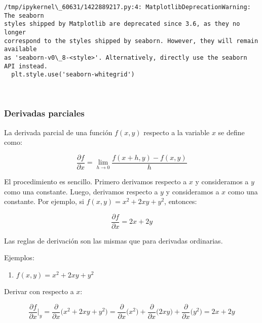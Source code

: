 \documentclass[11pt]{article}
\providecommand{\tightlist}{%
      \setlength{\itemsep}{0pt}\setlength{\parskip}{0pt}}
\begin{document}
    \begin{Verbatim}[commandchars=\\\{\}]
/tmp/ipykernel\_60631/1422889217.py:4: MatplotlibDeprecationWarning: The seaborn
styles shipped by Matplotlib are deprecated since 3.6, as they no longer
correspond to the styles shipped by seaborn. However, they will remain available
as 'seaborn-v0\_8-<style>'. Alternatively, directly use the seaborn API instead.
  plt.style.use('seaborn-whitegrid')
    \end{Verbatim}

    \begin{center}
    \end{center}
    { \hspace*{\fill} \\}
    
    \hypertarget{derivadas-parciales}{%
\subsubsection{Derivadas parciales}\label{derivadas-parciales}}

La derivada parcial de una función \(f(x,y)\) respecto a la variable
\(x\) se define como:

\[
\frac{\partial f}{\partial x} = \lim_{h \to 0} \frac{f(x+h,y) - f(x,y)}{h}
\]

El procedimiento es sencillo. Primero derivamos respecto a \(x\) y
consideramos a \(y\) como una constante. Luego, derivamos respecto a
\(y\) y consideramos a \(x\) como una constante. Por ejemplo, si
\(f(x,y) = x^2 + 2xy + y^2\), entonces:

\[
\frac{\partial f}{\partial x} = 2x + 2y
\]

Las reglas de derivación son las mismas que para derivadas ordinarias.

Ejemplos:

\begin{enumerate}
\def\labelenumi{\arabic{enumi}.}
\tightlist
\item
  \(f(x,y) = x^2 + 2xy + y^2\)
\end{enumerate}

Derivar con respecto a \(x\):

\[
\frac{\partial f}{\partial x} \Big|_{y} = \frac{\partial}{\partial x} \Big( x^2 + 2xy + y^2 \Big) = \frac{\partial}{\partial x} \Big( x^2 \Big) + \frac{\partial}{\partial x} \Big( 2xy \Big) + \frac{\partial}{\partial x} \Big( y^2 \Big) = 2x + 2y
\]
\end{document}
